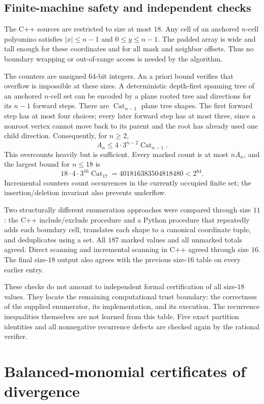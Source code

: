 \documentclass[11pt,a4paper]{article}
\theoremstyle{definition}
\theoremstyle{remark}
\begin{document}
\subsection{Finite-machine safety and independent checks}
The C++ sources are restricted to size at most $18$. Any cell of an anchored
$n$-cell polyomino satisfies $|x|\leq n-1$ and $0\leq y\leq n-1$.
The padded array is wide and tall enough for these coordinates and for all
mask and neighbor offsets. Thus no boundary wrapping or out-of-range
access is needed by the algorithm.

The counters are unsigned $64$-bit integers. An a priori bound verifies that
overflow is impossible at these sizes. A deterministic depth-first spanning
tree of an anchored $n$-cell set can be encoded by a plane rooted tree and
directions for its $n-1$ forward steps. There are
$\operatorname{Cat}_{n-1}$ plane tree shapes. The first forward step has at
most four choices; every later forward step has at most three, since a
nonroot vertex cannot move back to its parent and the root has already used
one child direction. Consequently, for $n\geq2$,
\[
 A_n\leq4\cdot3^{n-2}\operatorname{Cat}_{n-1}.
\]
This overcounts heavily but is sufficient. Every marked count is at most
$nA_n$, and the largest bound for $n\leq18$ is
\[
 18\cdot4\cdot3^{16}\operatorname{Cat}_{17}
 =401816383504818480<2^{64}.
\]
Incremental counters count occurrences in the currently occupied finite set;
the insertion/deletion invariant also prevents underflow.

Two structurally different enumeration approaches were compared through size
$11$: the C++ include/exclude procedure and a Python procedure that repeatedly
adds each boundary cell, translates each shape to a canonical coordinate
tuple, and deduplicates using a set. All $187$ marked values and all unmarked
totals agreed. Direct scanning and incremental scanning in C++ agreed through
size $16$. The final size-$18$ output also agrees with the previous
size-$16$ table on every earlier entry.

These checks do not amount to independent formal certification of all
size-$18$ values. They locate the remaining computational trust boundary:
the correctness of the supplied enumerator, its implementation, and its
execution. The recurrence inequalities themselves are not learned from this
table. Five exact partition identities and all nonnegative recurrence defects
are checked again by the rational verifier.

\section{Balanced-monomial certificates of divergence}
\label{sec:dual}
\end{document}
